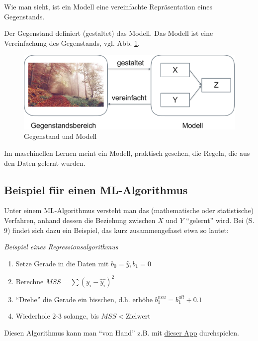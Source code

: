 \documentclass[
]{book}
\providecommand{\tightlist}{%
  \setlength{\itemsep}{0pt}\setlength{\parskip}{0pt}}
\begin{document}
Wie man sieht, ist ein Modell eine vereinfachte Repräsentation eines Gegenstands.

Der Gegenstand definiert (gestaltet) das Modell. Das Modell ist eine Vereinfachung des Gegenstands, vgl. Abb. \ref{fig:modell}.

\begin{figure}[H]

{\centering \includegraphics[width=0.5\linewidth]{img/modell-crop} 

}

\caption{Gegenstand und Modell}\label{fig:modell}
\end{figure}

Im maschinellen Lernen meint ein Modell, praktisch gesehen, die Regeln,
die aus den Daten gelernt wurden.

\hypertarget{beispiel-fuxfcr-einen-ml-algorithmus}{%
\subsection{Beispiel für einen ML-Algorithmus}\label{beispiel-fuxfcr-einen-ml-algorithmus}}

Unter einem ML-Algorithmus versteht man das (mathematische oder statistische) Verfahren,
anhand dessen die Beziehung zwischen \(X\) und \(Y\) ``gelernt'' wird. Bei \citet{rhys} (S. 9) findet sich dazu ein Beispiel, das kurz zusammengefasst etwa so lautet:

\emph{Beispiel eines Regressionsalgorithmus}

\begin{enumerate}
\def\labelenumi{\arabic{enumi}.}
\tightlist
\item
  Setze Gerade in die Daten mit \(b_0 = \hat{y}, b_1 = 0\)
\item
  Berechne \(MSS = \sum (y_i - \hat{y_i})^2\)
\item
  ``Drehe'' die Gerade ein bisschen, d.h. erhöhe \(b_1^{neu} = b_1^{alt} + 0.1\)
\item
  Wiederhole 2-3 solange, bis \(MSS < \text{Zielwert}\)
\end{enumerate}

Diesen Algorithmus kann man ``von Hand'' z.B. mit \href{https://shinyapps.org/showapp.php?app=https://shiny.psy.lmu.de/felix/lmfit\&by=Felix\%20Sch\%C3\%B6nbrodt\&title=Find-a-fit!\&shorttitle=Find-a-fit!}{dieser App} durchspielen.
\end{document}
